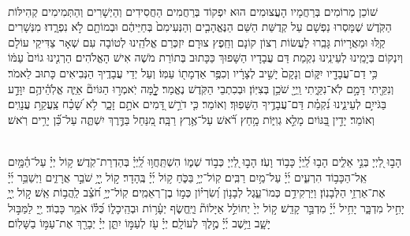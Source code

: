 \documentclass[twoside, openany, parskip=half, 11pt]{book}
\begin{document}
\\
שׁוֹכֵן מְרוֹמִים בְּרַחֲמָיו הָעֲצוּמִים הוּא יִפְקוֹד בְּרַחֲמִים הַחֲסִידִים וְהַיְשָׁרִים וְהַתְּמִימִים קְהִילּוֹת הַקֹּֽדֶשׁ שֶׁמָּסְרוּ נַפְשָׁם עַל קְדֻשַּׁת הַשֵּׁם הַנֶּאֱהָבִ֤ים וְהַנְּעִימִם֙ בְּחַיֵּיהֶ֔ם וּבְמוֹתָ֖ם לֹ֣א נִפְרָ֑דוּ׃ מִנְּשָׁרִים קַֽלּוּ וּמֵאֲרָיוֹת גָּבֵֽרוּ לַעֲשׂוֹת רְצוֹן קוֹנָם וְחֵֽפֶץ צוּרָם׃ יִזְכְּרֵם אֱלֹהֵֽינוּ לְטוֹבָה עִם שְׁאָר צַדִּיקֵי עוֹלָם וְיִנְקוֹם בְּיָמֵֽינוּ לְעֵינֵֽינוּ נִקְמַת דַּם עֲבָדָיו הַשָּׁפוּךְ כַּכָּתוּב בְּתוֹרַת מֹשֶׁה אִישׁ הָאֱלֹהִים׃ הַרְנִ֤ינוּ גוֹיִם֙ עַמּ֔וֹ כִּ֥י דַם־עֲבָדָ֖יו יִקּ֑וֹם וְנָקָם֙ יָשִׁ֣יב לְצָרָ֔יו וְכִפֶּ֥ר אַדְמָת֖וֹ עַמּֽוֹ׃ וְעַל יְדֵי עֲבָדֶֽיךָ הַנְּבִיאִים כָּתוּב לֵאמֹר׃ וְנִקֵּ֖יתִי דָּמָ֣ם לֹֽא־נִקֵּ֑יתִי וַֽיְיָ֖ שֹׁכֵ֥ן בְּצִיּֽוֹן׃ וּבְכִתְבֵי הַקֹּֽדֶשׁ נֶאֱמַר׃ לׇׇׇ֤מָּה יֹֽאמְר֣וּ הַגּוֹיִם֘ אַיֵּ֢ה אֱלֹֽהֵ֫יהֶ֥ם יִוָּדַ֣ע בַּגֹּייִ֣ם לְעֵינֵ֑ינוּ נִ֝קְמַ֗ת דַּם־עֲבָדֶ֥יךָ הַשָּׁפֽוּךְ׃ וְאוֹמֵר׃ כִּ֤י דֹרֵ֣שׁ דָּ֭מִים אֹתָ֣ם זָכָ֑ר לֹ֥א שָׁ֝כַ֗ח צַֽעֲקַ֥ת עֲנָוִֽים׃ וְאוֹמֵר׃ יָדִ֣ין בַּ֭גּוֹיִם מָלֵ֣א גְוִיּ֑וֹת מָ֥חַץ רֹ֝֗אשׁ עַל־אֶ֥רֶץ רַבָּֽה׃ מִ֭נַּחַל בַּדֶּ֣רֶךְ יִשְׁתֶּ֑ה עַל־כֵּ֝֗ן יָרִ֥ים רֹֽאשׁ׃



\sepline

\ashrei

\yehalelu

\\
%
הָב֣וּ לַ֭יְיָ בְּנֵ֣י אֵלִ֑ים הָב֥וּ לַֽ֝יְיָ֗ כָּב֥וֹד וָעֹֽז׃
הָב֣וּ לַ֭יְיָ כְּב֣וֹד שְׁמ֑וֹ הִשְׁתַּֽחֲו֥וּ לַֽ֝יְיָ֗ בְּהַדְרַת־קֹֽדֶשׁ׃
ק֥וֹל יְיָ֗ עַל־הַ֫מָּ֥יִם אֵֽל־הַכָּב֥וֹד הִרְעִ֑ים יְ֜יָ֗ עַל־מַ֥יִם רַבִּֽים׃
קֽוֹל־יְיָ֥ בַּכֹּ֑חַ ק֥וֹל יְ֜יָ֗ בֶּֽהָדָר׃
ק֣וֹל יְ֖יָ֥ שֹׁבֵ֣ר אֲרָזִ֑ים וַיְשַׁבֵּ֥ר יְ֜יָ֗ אֶת־אַרְזֵ֥י הַלְּבָנֽוֹן׃
וַיַּרְקִידֵ֥ם כְּמוֹ־עֵ֑גֶל לְבָנ֥וֹן וְ֝שִׂרְי֗וֹן כְּמ֣וֹ בֶן־רְאֵמִֽים׃
קֽוֹל־יְיָ֥ חֹ֝צֵ֗ב לַֽהֲב֥וֹת אֵֽשׁ׃
ק֣וֹל יְ֖יָ֥ יָחִ֣יל מִדְבָּ֑ר יָחִ֥יל יְ֜יָ֗ מִדְבַּ֣ר קָדֵֽשׁ׃
ק֣וֹל יְיָ֙ יְחוֹלֵ֣ל אַיָּלוֹת֘ וַיֶּֽחֱשׂ֢ף יְעָ֫ר֥וֹת וּבְהֵֽיכָל֑וֹ כֻּ֝לּ֗וֹ אֹמֵ֥ר כָּבֽוֹד׃
יְ֖יָ לַמַּבּ֣וּל יָשָׁ֑ב וַיֵּ֥שֶׁב יְ֜יָ֗ מֶ֣לֶךְ לְעוֹלָֽם׃
יְיָ֗ עֹ֖ז לְעַמּ֣וֹ יִתֵּ֑ן יְיָ֓ יְבָרֵ֖ךְ אֶת־עַמּ֣וֹ בַשָּׁלֽוֹם׃
\end{document}
